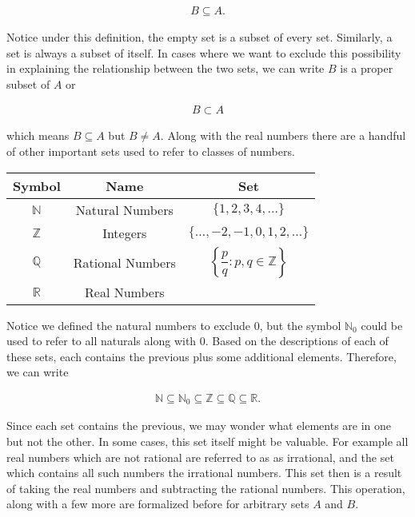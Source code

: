 \documentclass{report}
\begin{document}
\begin{align*}
	B \subseteq A.
\end{align*}

Notice under this definition, the empty set is a subset of every set. Similarly, a set is always a subset of itself. In cases where we want to exclude this possibility in explaining the relationship between the two sets, we can write $B$ is a proper subset of $A$ or 

\begin{align*}
	B \subset A
\end{align*}

which means $B \subseteq A$ but $B \neq A$. Along with the real numbers there are a handful of other important sets used to refer to classes of numbers.

\vspace{\baselineskip}
\begin{center}
	\begin{tabular}{ccc}
		\toprule
		Symbol & Name & Set \\
		\midrule
		$\mathbb{N}$ & Natural Numbers & $\{1, 2, 3, 4, \dots\}$ \\[10pt]
		$\mathbb{Z}$ & Integers & $\{\dots, -2, -1, 0, 1, 2, \dots\}$ \\[10pt]
		$\mathbb{Q}$ & Rational Numbers & $\left\{ \dfrac{p}{q} : p,q \in \mathbb{Z}\right\}$ \\[10pt]
		$\mathbb{R}$ & Real Numbers & \\
		\bottomrule
	\end{tabular}
\end{center}
\vspace{\baselineskip}

Notice we defined the natural numbers to exclude 0, but the symbol $\mathbb{N}_0$ could be used to refer to all naturals along with 0. Based on the descriptions of each of these sets, each contains the previous plus some additional elements. Therefore, we can write

\begin{align}
	\mathbb{N} \subseteq \mathbb{N}_0 \subseteq \mathbb{Z} \subseteq \mathbb{Q} \subseteq \mathbb{R}.
\end{align}

Since each set contains the previous, we may wonder what elements are in one but not the other. In some cases, this set itself might be valuable. For example all real numbers which are not rational are  referred to as as irrational, and the set which contains all such numbers the irrational numbers. This set then is a result of taking the real numbers and subtracting the rational numbers. This operation, along with a few more are formalized before for arbitrary sets $A$ and $B$.
\end{document}
